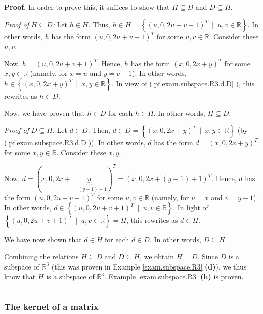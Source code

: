 \documentclass[numbers=enddot,12pt,final,onecolumn,notitlepage]{scrartcl}%
\theoremstyle{definition}
\newenvironment{proof}[1][Proof]{\noindent\textbf{#1.} }{\ \rule{0.5em}{0.5em}}
\begin{document}
\begin{proof}
In order to prove this, it suffices to show that $H\subseteq D$ and
$D\subseteq H$.

\textit{Proof of }$H\subseteq D$\textit{:} Let $h\in H$. Thus, $h\in
H=\left\{  \left(  u,0,2u+v+1\right)  ^{T}\ \mid\ u,v\in\mathbb{R}\right\}  $.
In other words, $h$ has the form $\left(  u,0,2u+v+1\right)  ^{T}$ for some
$u,v\in\mathbb{R}$. Consider these $u,v$.

Now, $h=\left(  u,0,2u+v+1\right)  ^{T}$. Hence, $h$ has the form $\left(
x,0,2x+y\right)  ^{T}$ for some $x,y\in\mathbb{R}$ (namely, for $x=u$ and
$y=v+1$). In other words, $h\in\left\{  \left(  x,0,2x+y\right)  ^{T}%
\ \mid\ x,y\in\mathbb{R}\right\}  $. In view of (\ref{pf.exam.subspace.R3.d.D}%
), this rewrites as $h\in D$.

Now, we have proven that $h\in D$ for each $h\in H$. In other words,
$H\subseteq D$.

\textit{Proof of }$D\subseteq H$\textit{:} Let $d\in D$. Then, $d\in
D=\left\{  \left(  x,0,2x+y\right)  ^{T}\ \mid\ x,y\in\mathbb{R}\right\}  $
(by (\ref{pf.exam.subspace.R3.d.D})). In other words, $d$ has the form
$d=\left(  x,0,2x+y\right)  ^{T}$ for some $x,y\in\mathbb{R}$. Consider these
$x,y$.

Now, $d=\left(  x,0,2x+\underbrace{y}_{=\left(  y-1\right)  +1}\right)
^{T}=\left(  x,0,2x+\left(  y-1\right)  +1\right)  ^{T}$. Hence, $d$ has the
form $\left(  u,0,2u+v+1\right)  ^{T}$ for some $u,v\in\mathbb{R}$ (namely,
for $u=x$ and $v=y-1$). In other words, $d\in\left\{  \left(
u,0,2u+v+1\right)  ^{T}\ \mid\ u,v\in\mathbb{R}\right\}  $. In light of
\newline$\left\{  \left(  u,0,2u+v+1\right)  ^{T}\ \mid\ u,v\in\mathbb{R}%
\right\}  =H$, this rewrites as $d\in H$.

We have now shown that $d\in H$ for each $d\in D$. In other words, $D\subseteq
H$.

Combining the relations $H\subseteq D$ and $D\subseteq H$, we obtain $H=D$.
Since $D$ is a subspace of $\mathbb{R}^{3}$ (this was proven in Example
\ref{exam.subspace.R3} \textbf{(d)}), we thus know that $H$ is a subspace of
$\mathbb{R}^{3}$. Example \ref{exam.subspace.R3} \textbf{(h)} is proven.
\end{proof}

\subsubsection{The kernel of a matrix}
\end{document}
